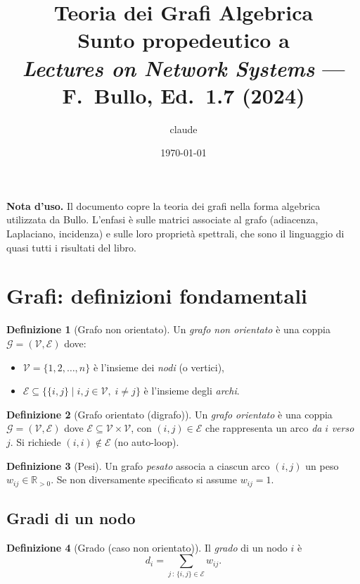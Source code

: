 \documentclass[a4paper,11pt]{article}
\title{%
  \textbf{Teoria dei Grafi Algebrica}\\[0.4em]
  \large Sunto propedeutico a\\
  \textit{Lectures on Network Systems} --- F.~Bullo, Ed.~1.7 (2024)
}
\author{claude}
\date{\today}
\theoremstyle{definition}
\newtheorem{defn}{Definizione}[section]
\theoremstyle{plain}
\theoremstyle{remark}
\newcommand{\R}{\mathbb{R}}
\begin{document}
\maketitle
\tableofcontents
\vspace{1em}
\noindent\textbf{Nota d'uso.} Il documento copre la teoria dei grafi nella forma
algebrica utilizzata da Bullo. L'enfasi è sulle matrici associate al grafo
(adiacenza, Laplaciano, incidenza) e sulle loro proprietà spettrali, che sono
il linguaggio di quasi tutti i risultati del libro.

\section{Grafi: definizioni fondamentali}

\begin{defn}[Grafo non orientato]
Un \emph{grafo non orientato} è una coppia $\mathcal{G} = (\mathcal{V}, \mathcal{E})$
dove:
\begin{itemize}[noitemsep]
  \item $\mathcal{V} = \{1, 2, \ldots, n\}$ è l'insieme dei \emph{nodi} (o vertici),
  \item $\mathcal{E} \subseteq \{\{i,j\} \mid i,j \in \mathcal{V},\; i \neq j\}$
        è l'insieme degli \emph{archi}.
\end{itemize}
\end{defn}

\begin{defn}[Grafo orientato (digrafo)]
Un \emph{grafo orientato} è una coppia $\mathcal{G} = (\mathcal{V}, \mathcal{E})$
dove $\mathcal{E} \subseteq \mathcal{V} \times \mathcal{V}$, con $(i,j) \in \mathcal{E}$
che rappresenta un arco \emph{da} $i$ \emph{verso} $j$. Si richiede $(i,i) \notin \mathcal{E}$
(no auto-loop).
\end{defn}

\begin{defn}[Pesi]
Un grafo \emph{pesato} associa a ciascun arco $(i,j)$ un peso
$w_{ij} \in \R_{>0}$. Se non diversamente specificato si assume $w_{ij}=1$.
\end{defn}

\subsection{Gradi di un nodo}

\begin{defn}[Grado (caso non orientato)]
Il \emph{grado} di un nodo $i$ è
\[
  d_i = \sum_{j \,:\, \{i,j\}\in\mathcal{E}} w_{ij}.
\]
\end{defn}
\end{document}
